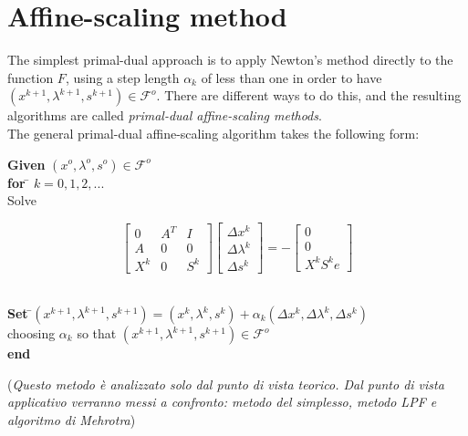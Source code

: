 \documentclass[a4paper,10 pt,titlepage,twoside]{book}
\theoremstyle{plain}
\theoremstyle{definition}
\theoremstyle{remark}
\begin{document}
\section{Affine-scaling method}

The simplest primal-dual approach is to apply Newton's method directly to the function $F$, using a step length $\alpha_{k}$ of less than one in order to have $(x^{k+1},\lambda^{k+1},s^{k+1})\in \mathcal{F}^{o}$. There are different ways to do this, and the resulting algorithms are called \textit{primal-dual affine-scaling methods}.\\ 
 The general primal-dual affine-scaling algorithm takes the following form:
\begin{tabbing}
	\textbf{Given} $(x^{o}, \lambda^{o}, s^{o})\in\mathcal{F}^{o}$ \\
	\textbf{for} \= $k = 0, 1, 2,...$ \\
	\> Solve
\end{tabbing}
\begin{equation}\label{(AS)}
\begin{bmatrix}
0&A^{T}&I \\A&0&0\\X^{k}&0&S^{k}
\end{bmatrix}\begin{bmatrix}
\Delta x^{k}\\\Delta\lambda^{k} \\\Delta s^{k}
\end{bmatrix}=-\begin{bmatrix}
0\\0\\X^{k}S^{k}e
\end{bmatrix}
\end{equation}
\begin{tabbing}
	\\
	\textbf{Set} \=$(x^{k+1}, \lambda^{k+1}, s^{k+1}) = (x^{k}, \lambda^{k}, s^{k})+ \alpha_{k}(\Delta x^{k}, \Delta\lambda^{k}, \Delta s^{k})$\\
	\> choosing $\alpha_{k}$ so that $(x^{k+1},\lambda^{k+1}, s^{k+1})\in\mathcal{F}^{o}$ \\
	\textbf{end}
\end{tabbing}
(\textit{Questo metodo è analizzato solo dal punto di vista teorico. Dal punto di vista applicativo verranno messi a confronto: metodo del simplesso, metodo LPF e algoritmo di Mehrotra})
\end{document}

